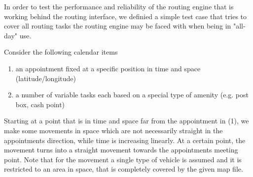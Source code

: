
In order to test the performance and reliability of the routing engine that is working behind the routing interface, we definied a simple test case that tries to cover all routing tasks the routing engine may be faced with when being in "all-day" use.\newline

Consider the following calendar items
\begin{enumerate}
	\item an appointment fixed at a specific position in time and space (latitude/longitude)
	\item a number of variable tasks each based on a special type of amenity (e.g. post box, cash point)
\end{enumerate}

Starting at a point that is in time and space far from the appointment in (1), we make some movements in space which are not necessarily straight in the appointments direction, while time is increasing linearly. At a certain point, the movement turns into a straight movement towards the appointments meeting point. Note that for the movement a single type of vehicle is assumed and it is restricted to an area in space, that is completely covered by the given map file.\newline

